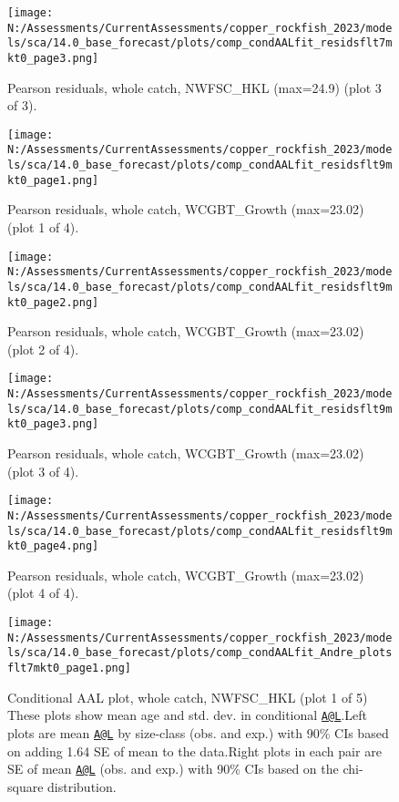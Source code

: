 \documentclass[11pt,
  english,
  letterpaper,
]{article}
\begin{document}
\begin{figure}
\centering
\texttt{[image: N:/Assessments/CurrentAssessments/copper\_rockfish\_2023/models/sca/14.0\_base\_forecast/plots/comp\_condAALfit\_residsflt7mkt0\_page3.png]}
\caption{Pearson residuals, whole catch, NWFSC\_HKL (max=24.9) (plot 3 of 3).\label{fig:comp_condAALfit_residsflt7mkt0_page3}}
\end{figure}

\begin{figure}
\centering
\texttt{[image: N:/Assessments/CurrentAssessments/copper\_rockfish\_2023/models/sca/14.0\_base\_forecast/plots/comp\_condAALfit\_residsflt9mkt0\_page1.png]}
\caption{Pearson residuals, whole catch, WCGBT\_Growth (max=23.02) (plot 1 of 4).\label{fig:comp_condAALfit_residsflt9mkt0_page1}}
\end{figure}

\begin{figure}
\centering
\texttt{[image: N:/Assessments/CurrentAssessments/copper\_rockfish\_2023/models/sca/14.0\_base\_forecast/plots/comp\_condAALfit\_residsflt9mkt0\_page2.png]}
\caption{Pearson residuals, whole catch, WCGBT\_Growth (max=23.02) (plot 2 of 4).\label{fig:comp_condAALfit_residsflt9mkt0_page2}}
\end{figure}

\begin{figure}
\centering
\texttt{[image: N:/Assessments/CurrentAssessments/copper\_rockfish\_2023/models/sca/14.0\_base\_forecast/plots/comp\_condAALfit\_residsflt9mkt0\_page3.png]}
\caption{Pearson residuals, whole catch, WCGBT\_Growth (max=23.02) (plot 3 of 4).\label{fig:comp_condAALfit_residsflt9mkt0_page3}}
\end{figure}

\begin{figure}
\centering
\texttt{[image: N:/Assessments/CurrentAssessments/copper\_rockfish\_2023/models/sca/14.0\_base\_forecast/plots/comp\_condAALfit\_residsflt9mkt0\_page4.png]}
\caption{Pearson residuals, whole catch, WCGBT\_Growth (max=23.02) (plot 4 of 4).\label{fig:comp_condAALfit_residsflt9mkt0_page4}}
\end{figure}

\begin{figure}
\centering
\texttt{[image: N:/Assessments/CurrentAssessments/copper\_rockfish\_2023/models/sca/14.0\_base\_forecast/plots/comp\_condAALfit\_Andre\_plotsflt7mkt0\_page1.png]}
\caption{Conditional AAL plot, whole catch, NWFSC\_HKL (plot 1 of 5) These plots show mean age and std. dev. in conditional \href{mailto:A@L}{\nolinkurl{A@L}}.Left plots are mean \href{mailto:A@L}{\nolinkurl{A@L}} by size-class (obs. and exp.) with 90\% CIs based on adding 1.64 SE of mean to the data.Right plots in each pair are SE of mean \href{mailto:A@L}{\nolinkurl{A@L}} (obs. and exp.) with 90\% CIs based on the chi-square distribution.\label{fig:comp_condAALfit_Andre_plotsflt7mkt0_page1}}
\end{figure}
\end{document}
